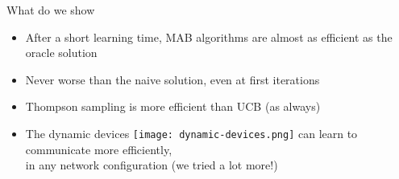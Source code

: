 \begin{frameO}

    \begin{colorblock}{What do we show}

        \begin{itemize}
            \setlength\itemsep{10pt}
            \item
                  After a short learning time, MAB algorithms are almost as efficient as
                  the oracle solution
            \item
                  Never worse than the naive solution, even at first iterations
            \item
                  Thompson sampling is more efficient than UCB
                  (as always)
            \item
                  The dynamic devices \texttt{[image: dynamic-devices.png]} can learn to communicate more efficiently,\\
                  in any network configuration (we tried a lot more!)
        \end{itemize}

    \end{colorblock}

\end{frameO}






